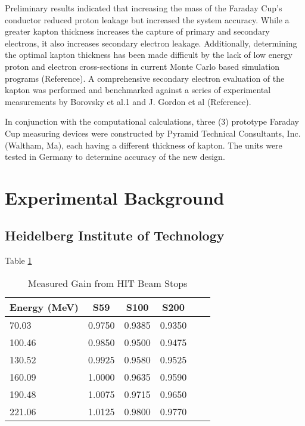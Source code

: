 \documentclass{mc2015}
\begin{document}
Preliminary results indicated that increasing the mass of the Faraday Cup’s conductor reduced proton leakage but increased the system accuracy. While a greater kapton thickness increases the capture of primary and secondary electrons, it also increases secondary electron leakage. Additionally, determining the optimal kapton thickness has been made difficult by the lack of low energy proton and electron cross-sections in current Monte Carlo based simulation programs (Reference). A comprehensive secondary electron evaluation of the kapton was performed and benchmarked against a series of experimental measurements by Borovsky et al.1 and J. Gordon et al (Reference).

In conjunction with the computational calculations, three (3) prototype Faraday Cup measuring devices were constructed by Pyramid Technical Consultants, Inc. (Waltham, Ma), each having a different thickness of kapton. The units were tested in Germany to determine accuracy of the new design. 


\section{Experimental Background}


\subsection{Heidelberg Institute of Technology}

Table \ref{tab:HIT_data}

\begin{table}
  \centering
  \caption{Measured Gain from HIT Beam Stops}
  \begin{tabular}{lccccc}
    \toprule
    Energy (MeV) & S59 & S100 & S200 \\
    \midrule
    70.03  & \num{0.9750} & \num{0.9385} & \num{0.9350} \\
    100.46 & \num{0.9850} & \num{0.9500} & \num{0.9475} \\
    130.52 & \num{0.9925} & \num{0.9580} & \num{0.9525} \\
    160.09 & \num{1.0000} & \num{0.9635} & \num{0.9590} \\
    190.48 & \num{1.0075} & \num{0.9715} & \num{0.9650} \\
    221.06 & \num{1.0125} & \num{0.9800} & \num{0.9770} \\
    \bottomrule
  \end{tabular}
  \label{tab:HIT_data}
\end{table}
\end{document}
